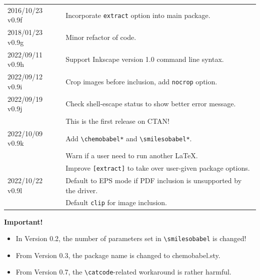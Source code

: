 \documentclass[12pt]{ltjsarticle}
\def\Lpack#1{\textsf{#1}}
\begin{document}
\begin{table}[h]
\begin{tabular}{ll}
2016/10/23 v0.9f & Incorporate \verb|extract| option into main package. \\
2018/01/23 v0.9g & Minor refactor of code. \\
2022/09/11 v0.9h & Support Inkscape version 1.0 command line syntax. \\
2022/09/12 v0.9i & Crop images before inclusion, add \verb|nocrop| option. \\
2022/09/19 v0.9j & Check shell-escape status to show better error message. \\
                 & This is the first release on CTAN! \\
2022/10/09 v0.9k & Add \verb|\chemobabel*| and \verb|\smilesobabel*|. \\
                 & Warn if a user need to run another \LaTeX. \\
                 & Improve \verb|[extract]| to take over user-given package options. \\
2022/10/22 v0.9l & Default to EPS mode if PDF inclusion is unsupported by the driver. \\
                 & Default \verb|clip| for image inclusion. \\
\end{tabular}
\end{table}

\textbf{Important!}
\begin{itemize}
\item In Version 0.2, the number of parameters set in \verb|\smilesobabel| is changed!
\item From Version 0.3, the package name is changed to \Lpack{chemobabel.sty}.
\item From Version 0.7, the \verb|\catcode|-related workaround is rather harmful.
\end{itemize}

\clearpage
\end{document}
